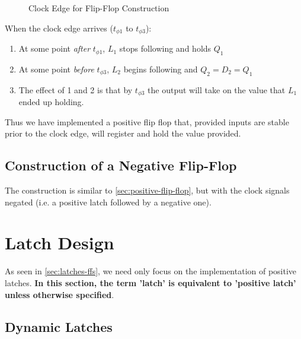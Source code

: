 \documentclass[11pt]{report}
\begin{document}
\begin{figure}[t]
\centering
{}
\caption{Clock Edge for Flip-Flop Construction}\label{fig:clock-edge-ff}

\end{figure}

When the clock edge arrives ($t_{\phi1}$ to $t_{\phi3}$):
\begin{enumerate}
	\item At some point \textit{after} $t_{\phi1}$, $L_1$ stops following and holds $Q_1$
	\item At some point \textit{before} $t_{\phi3}$, $L_2$ begins following and $Q_2 = D_2 = Q_1$
	\item The effect of 1 and 2 is that by $t_{\phi3}$ the output will take on the value that $L_1$ ended up holding.
\end{enumerate}

Thus we have implemented a positive flip flop that, provided inputs are stable prior to the clock edge, will register and hold the value provided.

\subsection{Construction of a Negative Flip-Flop}

The construction is similar to \autoref{sec:positive-flip-flop}, but with the clock signals negated (i.e. a positive latch followed by a negative one).


\section{Latch Design}
As seen in \autoref{sec:latches-ffs}, we need only focus on the implementation of positive latches. \textbf{In this section, the term 'latch' is equivalent to 'positive latch' unless otherwise specified}.

\subsection{Dynamic Latches}
\end{document}

